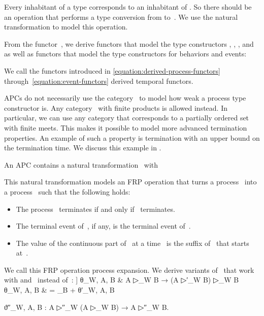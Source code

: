 \documentclass[copyright,creativecommons]{eptcs}
\newcommand{\relwithsizeof}[2]{
    \mathrel{
        \text{\makebox[0mm][c]{\phantom{}\makebox[0mm][c]{}}\phantom{}}
    }
}
\newcommand{\id}{\mathrm{id}}
\begin{document}
Every inhabitant of a type  corresponds to an inhabitant of . So there should be an operation that performs a type conversion from 
to~. We use the natural transformation  to model this
operation.

From the functor~, we derive functors  that model the type
constructors , , , and~ as well as functors  that model the type constructors for behaviors and events:

We call the functors introduced in \eqref{equation:derived-process-functors}
through~\eqref{equation:event-functors} derived temporal functors.

APCs do not necessarily use the category~ to model how weak a process type
constructor is. Any category~ with finite products is allowed instead. In
particular, we can use any category that corresponds to a partially ordered set
with finite meets. This makes it possible to model more advanced termination
properties. An example of such a property is termination with an upper bound on
the termination time. We discuss this example in
.


An APC contains a natural transformation~ with

This natural transformation models an FRP operation that turns a process~
into a process~ such that the following holds:
\begin{itemize}

\item

The process~ terminates if and only if~ terminates.

\item

The terminal event of~, if any, is the terminal event of~.

\item

The value of the continuous part of~ at a time~ is the suffix of~ that
starts at~.

\end{itemize}
We call this FRP operation process expansion. We derive variants of~ that
work with  and~ instead of~:
\topsep]
θ_{W, A, B}  & \relwithsizeof=: A ▷_W B → \left(A ▷′_W B\right) ▷_W B                      \notag\\
\label{equation:no-prime-theta}
θ_{W, A, B}  & =                \id_B + θ′_{W, A, B}

ϑ″_{W, A, B} : A ▷″_W (A ▷_W B) → A ▷″_W B\enspace.
\end{document}
